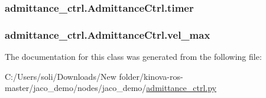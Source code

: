 \subsubsection[{\texorpdfstring{timer}{timer}}]{\setlength{\rightskip}{0pt plus 5cm}admittance\+\_\+ctrl.\+Admittance\+Ctrl.\+timer}\hypertarget{classadmittance__ctrl_1_1_admittance_ctrl_a83d7b0847cefa7749b3d4a9672c4d1c4}{}\label{classadmittance__ctrl_1_1_admittance_ctrl_a83d7b0847cefa7749b3d4a9672c4d1c4}
\subsubsection[{\texorpdfstring{vel\+\_\+max}{vel_max}}]{\setlength{\rightskip}{0pt plus 5cm}admittance\+\_\+ctrl.\+Admittance\+Ctrl.\+vel\+\_\+max}\hypertarget{classadmittance__ctrl_1_1_admittance_ctrl_a2d0c030242f05f5aed46ce03810d721a}{}\label{classadmittance__ctrl_1_1_admittance_ctrl_a2d0c030242f05f5aed46ce03810d721a}


The documentation for this class was generated from the following file\+:\begin{DoxyCompactItemize}
\item 
C\+:/\+Users/soli/\+Downloads/\+New folder/kinova-\/ros-\/master/jaco\+\_\+demo/nodes/jaco\+\_\+demo/\hyperlink{admittance__ctrl_8py}{admittance\+\_\+ctrl.\+py}\end{DoxyCompactItemize}
